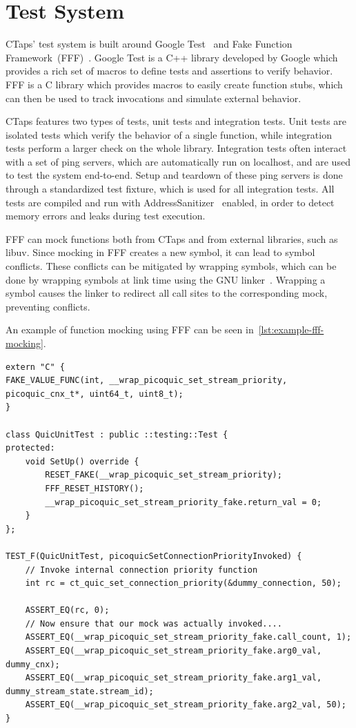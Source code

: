 \section{Test System} \label{testing}
CTaps' test system is built around Google Test~\cite{GoogleTest2025} and
Fake Function Framework~(FFF)~\cite{longFakeFunctionFramework2025}. Google Test is a C++ library developed by
Google which provides a rich set of macros to define tests and assertions
to verify behavior. FFF is a C library which provides macros to easily
create function stubs, which can then be used to track invocations
and simulate external behavior.

CTaps features two types of tests, unit tests and integration tests.
Unit tests are isolated tests which verify the behavior of a single function, while
integration tests perform a larger check on the
whole library. Integration tests often interact with a set of ping servers, which
are automatically run on localhost, and are used
to test the system end-to-end. Setup and teardown of these
ping servers is done through a standardized test fixture, which is used for all
integration tests.
All tests are compiled and run with AddressSanitizer~\cite{addressSanitizer}
enabled, in order to detect memory errors and leaks during test execution.

FFF can mock functions both from CTaps and from external libraries,
such as libuv. Since mocking in FFF creates a new symbol, it can lead to
symbol conflicts.
These conflicts can be mitigated by wrapping symbols,
which can be done by wrapping symbols at link time using the GNU linker~\cite{gnuLinkerManual}.
Wrapping a symbol causes the linker to redirect all call sites to the corresponding mock, preventing conflicts.

An example of function mocking using FFF can be seen in~\cref{lst:example-fff-mocking}.

\begin{listing}[htbp]
\begin{verbatim}
extern "C" {
FAKE_VALUE_FUNC(int, __wrap_picoquic_set_stream_priority, picoquic_cnx_t*, uint64_t, uint8_t);
}

class QuicUnitTest : public ::testing::Test {
protected:
    void SetUp() override {
        RESET_FAKE(__wrap_picoquic_set_stream_priority);
        FFF_RESET_HISTORY();
        __wrap_picoquic_set_stream_priority_fake.return_val = 0;
    }
};

TEST_F(QuicUnitTest, picoquicSetConnectionPriorityInvoked) {
    // Invoke internal connection priority function
    int rc = ct_quic_set_connection_priority(&dummy_connection, 50);

    ASSERT_EQ(rc, 0);
    // Now ensure that our mock was actually invoked....
    ASSERT_EQ(__wrap_picoquic_set_stream_priority_fake.call_count, 1);
    ASSERT_EQ(__wrap_picoquic_set_stream_priority_fake.arg0_val, dummy_cnx);
    ASSERT_EQ(__wrap_picoquic_set_stream_priority_fake.arg1_val, dummy_stream_state.stream_id);
    ASSERT_EQ(__wrap_picoquic_set_stream_priority_fake.arg2_val, 50);
}
\end{verbatim}
\caption[Mocking UDP functions using FFF]{Example test mocking UDP functions using FFF.}
\label{lst:example-fff-mocking}
\end{listing}


